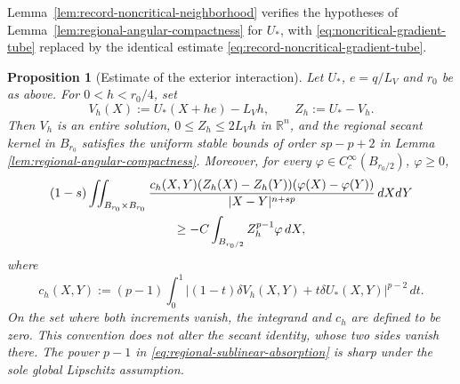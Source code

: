 \documentclass[11pt,reqno]{amsart}
\numberwithin{equation}{section}
\newcommand{\R}{\mathbb R}
\newcommand{\dd}{\,d}
\newtheorem{proposition}[theorem]{Proposition}
\theoremstyle{remark}
\begin{document}
Lemma~\ref{lem:record-noncritical-neighborhood} verifies the hypotheses
of Lemma~\ref{lem:regional-angular-compactness} for \(U_*\), with
\eqref{eq:noncritical-gradient-tube} replaced by the identical estimate
\eqref{eq:record-noncritical-gradient-tube}.

\begin{proposition}[Estimate of the exterior interaction]
\label{prop:crossed-sublinear-absorption}
Let $U_*$, $e=q/L_V$ and $r_0$ be as above.  For $0<h<r_0/4$, set
\begin{equation*}
 V_h(X):=U_*(X+he)-L_Vh,
 \qquad Z_h:=U_*-V_h.
\end{equation*}
Then $V_h$ is an entire solution, $0\le Z_h\le2L_Vh$ in $\R^n$, and
the regional secant kernel in $B_{r_0}$ satisfies the uniform stable bounds
of order $sp-p+2$ in Lemma
\ref{lem:regional-angular-compactness}.  Moreover, for every
$\varphi\in C_c^\infty(B_{r_0/2})$, $\varphi\ge0$,
\begin{equation}
 \begin{split}
 &(1-s)\iint_{B_{r_0}\times B_{r_0}}
 \frac{c_h(X,Y)(Z_h(X)-Z_h(Y))
       (\varphi(X)-\varphi(Y))}
 {|X-Y|^{n+sp}}\dd X\!\dd Y\\
 &\hspace{35mm}\ge
 -C\int_{B_{r_0/2}}Z_h^{p-1}\varphi\dd X,
 \end{split}
 \label{eq:regional-sublinear-absorption}
\end{equation}
where
\begin{equation*}
 c_h(X,Y):=(p-1)\int_0^1
 |(1-t)\delta V_h(X,Y)+t\delta U_*(X,Y)|^{p-2}\dd t.
\end{equation*}
On the set where both increments vanish, the integrand and \(c_h\)
are defined to be zero.  This convention does not alter the secant
identity, whose two sides vanish there.
The power $p-1$ in \eqref{eq:regional-sublinear-absorption} is sharp under
the sole global Lipschitz assumption.
\end{proposition}
\end{document}
